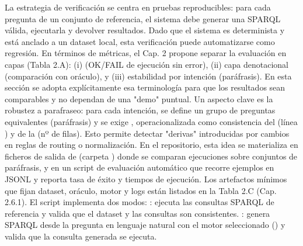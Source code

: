 {}\markdownRendererInterblockSeparator
{}\markdownRendererInterblockSeparator
{}La estrategia de verificación se centra en pruebas  reproducibles: para cada pregunta de un conjunto de referencia, el sistema debe generar una SPARQL válida, ejecutarla y devolver resultados. Dado que el sistema es determinista y está anclado a un dataset local, esta verificación puede automatizarse como regresión.\markdownRendererInterblockSeparator
{}En términos de métricas, el Cap. 2 propone separar la evaluación en capas (Tabla 2.A): (i)  (OK/FAIL de ejecución sin error), (ii) capa denotacional (comparación con oráculo), y (iii) estabilidad por intención (paráfrasis). En esta sección se adopta explícitamente esa terminología para que los resultados sean comparables y no dependan de una "demo" puntual.\markdownRendererInterblockSeparator
{}Un aspecto clave es la robustez a parafraseo: para cada intención, se define un grupo de preguntas equivalentes (paráfrasis) y se exige , operacionalizada como consistencia del  (línea ) y de la  (nº de filas). Esto permite detectar "derivas" introducidas por cambios en reglas de routing o normalización.\markdownRendererInterblockSeparator
{}En el repositorio, esta idea se materializa en ficheros de salida de  (carpeta ) donde se comparan ejecuciones sobre conjuntos de paráfrasis, y en un script de evaluación automático que recorre ejemplos en JSONL y reporta tasa de éxito y tiempos de ejecución. Los artefactos mínimos que fijan dataset, oráculo, motor y logs están listados en la Tabla 2.C (Cap. 2.6.1).\markdownRendererInterblockSeparator
{}El script  implementa dos modos:\markdownRendererInterblockSeparator
{}\markdownRendererUlBeginTight
\markdownRendererUlItem {}: ejecuta las consultas SPARQL de referencia y valida que el dataset y las consultas son consistentes.\markdownRendererUlItemEnd 
\markdownRendererUlItem {}: genera SPARQL desde la pregunta en lenguaje natural con el motor seleccionado () y valida que la consulta generada se ejecuta.\markdownRendererUlItemEnd 
